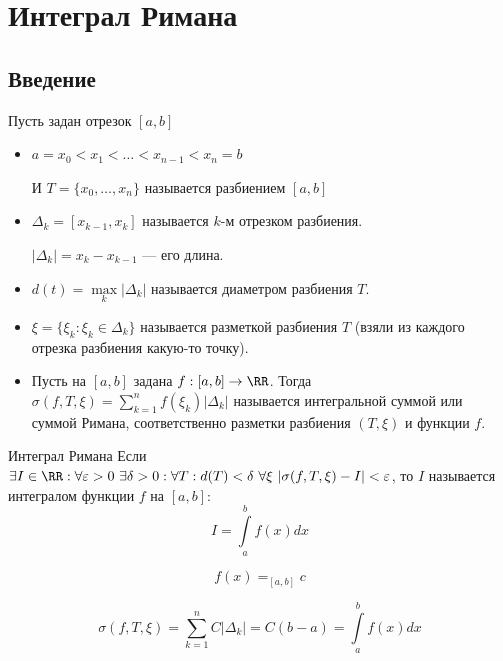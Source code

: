 \section{Интеграл Римана}

\subsection{Введение}

\begin{defn}{}{}
    Пусть задан отрезок \( [a, b] \)

    \begin{itemize}
        \item
            \(a = x_0 < x_1 < \ldots < x_{n - 1} < x_n = b \)

            И \( T = \{ x_0, \ldots, x_n \} \) называется разбиением \( [a, b] \)
        \item
            \( \Delta_k = [x_{k - 1}, x_k] \) называется \( k \)-м отрезком разбиения.

            \( |\Delta_k| = x_k - x_{k - 1} \) --- его длина.
        \item
            \( d(t) = \max\limits_{k} |\Delta_k| \) называется диаметром разбиения \( T \).
        \item
            \( \xi = \{ \xi_k : \xi_k \in \Delta_k \} \) называется разметкой разбиения \( T \)
            (взяли из каждого отрезка разбиения какую-то точку).
        \item
            Пусть на \( [a, b] \) задана \( f : [a, b] \to \RR \).
            Тогда \( \sigma(f, T, \xi) = \sum\limits_{k = 1}^{n} f(\xi_k) |\Delta_k| \)
            называется интегральной суммой или суммой Римана,
            соответственно разметки разбиения \( (T, \xi) \) и функции \( f \).
    \end{itemize}
\end{defn}

\begin{defn}{Интеграл Римана}{}
    Если
    \(
        \exists I \in \RR : \forall \varepsilon > 0 \ \exists \delta > 0 :
        \forall T : d(T) < \delta \ \forall \xi \
        |\sigma(f, T, \xi) - I| < \varepsilon
    \),
    то \( I \) называется интегралом функции \( f \) на \( [a, b] \):
    \[
        I = \int\limits_{a}^{b} f(x) dx
    \]
\end{defn}

\begin{example}{}{}
    \[
        f(x) =_{[a, b]} c
    \]
\end{example}
\[
    \sigma(f, T, \xi)
    =
    \sum\limits_{k = 1}^{n} C|\Delta_k|
    =
    C(b - a)
    =
    \int\limits_{a}^{b} f(x) dx
\]

